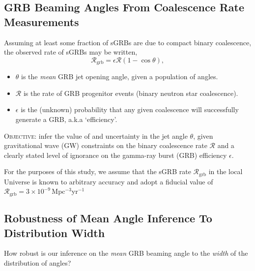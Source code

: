 \documentclass[a0,landscape]{a0poster}
\newcommand{\grbrate}{{{\mathcal R}_{\mathrm{grb}}}}
\newcommand{\cbcrate}{{{\mathcal R}}}
\def\gw#1{gravitational wave#1 (GW#1)\gdef\gw{GW}}
\def\grb#1{gamma-ray burst#1 (GRB#1)\gdef\grb{GRB}}
\begin{document}
\begin{multicols}{4}

\section*{\centering GRB Beaming Angles From Coalescence Rate Measurements}
Assuming at least some fraction of sGRBs are due to compact binary
coalescence, the observed rate of sGRBs may be written,
%
\begin{equation}\label{eq:rate2angle}
\grbrate=\epsilon\cbcrate(1-\cos \theta),
\end{equation}
%
\begin{itemize}
    \item $\theta$ is the \emph{mean} GRB jet opening angle, given a population
        of angles.%
    \item $\cbcrate$ is the rate of GRB progenitor events (binary
        neutron star coalescence).  
    \item $\epsilon$ is the (unknown) probability that any given coalescence will
        successfully generate a GRB, a.k.a `efficiency'.
\end{itemize}

{\large \textsc{Objective}}: infer the value of and uncertainty in the jet
angle $\theta$, given \gw{} constraints on the binary coalescence rate
$\cbcrate$ and a clearly stated level of ignorance on the \grb{} efficiency
$\epsilon$.

For the purposes of this study, we assume that the sGRB rate $\grbrate$ in the
local Universe is known to arbitrary accuracy and adopt a fiducial value of
$\grbrate = 3\times10^{-9}$\,Mpc$^{-3}$yr$^{-1}$


\subsection*{\centering Robustness of Mean Angle Inference To Distribution Width}

How robust is our inference on the \emph{mean} GRB beaming angle to the
\emph{width} of the distribution of angles?  


\end{multicols}
\end{document}
